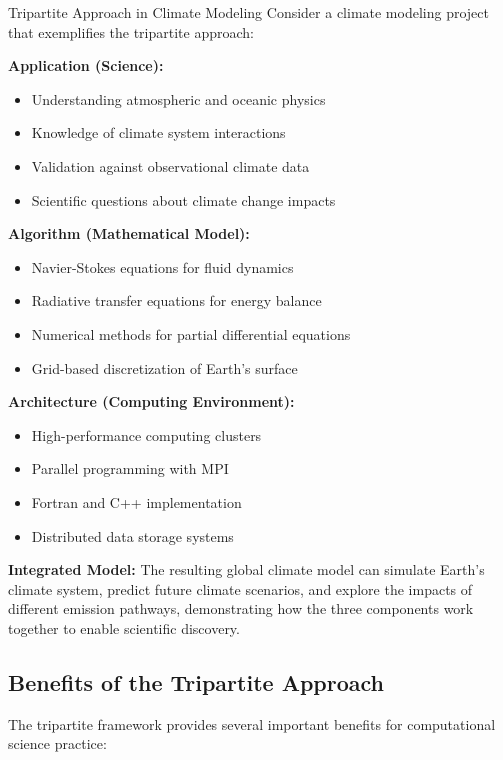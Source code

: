 \begin{examplebox}{Tripartite Approach in Climate Modeling}
Consider a climate modeling project that exemplifies the tripartite approach:

\textbf{Application (Science):}
\begin{itemize}
    \item Understanding atmospheric and oceanic physics
    \item Knowledge of climate system interactions
    \item Validation against observational climate data
    \item Scientific questions about climate change impacts
\end{itemize}

\textbf{Algorithm (Mathematical Model):}
\begin{itemize}
    \item Navier-Stokes equations for fluid dynamics
    \item Radiative transfer equations for energy balance
    \item Numerical methods for partial differential equations
    \item Grid-based discretization of Earth's surface
\end{itemize}

\textbf{Architecture (Computing Environment):}
\begin{itemize}
    \item High-performance computing clusters
    \item Parallel programming with MPI
    \item Fortran and C++ implementation
    \item Distributed data storage systems
\end{itemize}

\textbf{Integrated Model:}
The resulting global climate model can simulate Earth's climate system, predict future climate scenarios, and explore the impacts of different emission pathways, demonstrating how the three components work together to enable scientific discovery.
\end{examplebox}

\subsection{Benefits of the Tripartite Approach}

The tripartite framework provides several important benefits for computational science practice:

